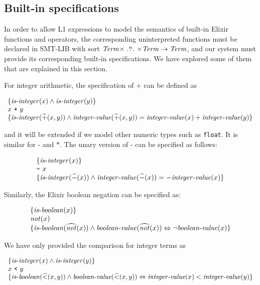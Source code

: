 \subsection{Built-in specifications}

In order to allow L1 expressions to model the semantics of built-in Elixir
functions and operators, the corresponding uninterpreted functions must be
declared in SMT-LIB with sort $\mathit{Term} \times \stackrel{n}{\dots} \times \mathit{Term}
\rightarrow \mathit{Term}$, and our system must provide its corresponding built-in
specifications. We have explored some of them that are explained in this
section.

For integer arithmetic, the specification of $\texttt{+}$ can be defined as

\[
\begin{array}{l}
\{ \mathit{is\mbox{-}integer}(x) \wedge \mathit{is\mbox{-}integer}(y) \}\\
x~\texttt{+}~y\\
\{ \mathit{is\mbox{-}integer}(\widehat{+}(x, y)) \wedge 
  \mathit{integer\mbox{-}value}(\widehat{+}(x, y)) = \mathit{integer\mbox{-}value}(x) + \mathit{integer\mbox{-}value}(y) \}
\end{array}
\]

and it will be extended if we model other numeric types such as \verb|float|.
It is similar for $\texttt{-}$ and $\texttt{*}$. The unary version of
$\texttt{-}$ can be specified as follows:

\[
\begin{array}{l}
\{ \mathit{is\mbox{-}integer}(x) \}\\
\texttt{-}~x\\
\{ \mathit{is\mbox{-}integer}(\widehat{-}(x)) \wedge 
  \mathit{integer\mbox{-}value}(\widehat{-}(x)) = -\mathit{integer\mbox{-}value}(x) \}
\end{array}
\]

Similarly, the Elixir boolean negation can be specified as:

\[
\begin{array}{l}
\{ \mathit{is\mbox{-}boolean}(x) \}\\
\mathit{not}(x)\\
\{ \mathit{is\mbox{-}boolean}(\widehat{\mathit{not}}(x)) \wedge 
  \mathit{boolean\mbox{-}value}(\widehat{\mathit{not}}(x)) \Leftrightarrow \neg\mathit{boolean\mbox{-}value}(x) \}
\end{array}
\]

We have only provided the comparison for integer terms as

\[
\begin{array}{l}
\{ \mathit{is\mbox{-}integer}(x) \wedge \mathit{is\mbox{-}integer}(y) \}\\
x~\texttt{<}~y\\
\{ \mathit{is\mbox{-}boolean}(\widehat{<}(x, y)) \wedge 
  \mathit{boolean\mbox{-}value}(\widehat{<}(x, y)) \Leftrightarrow \mathit{integer\mbox{-}value}(x) < \mathit{integer\mbox{-}value}(y) \}
\end{array}
\]

